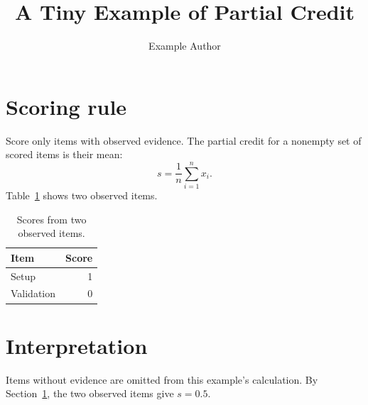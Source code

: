 \documentclass[twocolumn]{article}
\title{A Tiny Example of Partial Credit}
\author{Example Author}
\date{}
\begin{document}
\maketitle
\section{Scoring rule}\label{sec:rule}
Score only items with observed evidence. The partial credit for a nonempty
set of scored items is their mean:
\begin{equation}
  s = \frac{1}{n}\sum_{i=1}^{n} x_i .
\end{equation}
Table~\ref{tab:example} shows two observed items.
\begin{table}[h]
\centering
\caption{Scores from two observed items.}\label{tab:example}
\begin{tabular}{lr}
Item & Score\\\hline
Setup & 1\\
Validation & 0\\
\end{tabular}
\end{table}
\section{Interpretation}
Items without evidence are omitted from this example's calculation.
By Section~\ref{sec:rule}, the two observed items give $s=0.5$.
\end{document}
